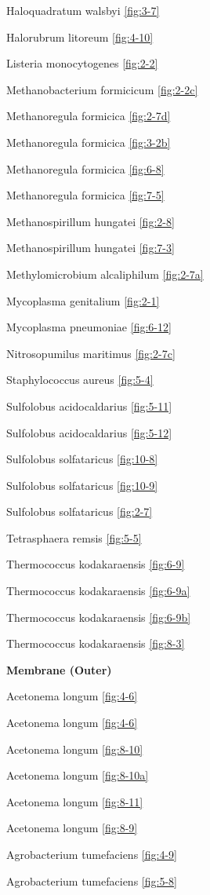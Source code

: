 \documentclass[]{tufte-book}
\begin{document}
Haloquadratum walsbyi \ref{fig:3-7}

Halorubrum litoreum \ref{fig:4-10}

Listeria monocytogenes \ref{fig:2-2}

Methanobacterium formicicum \ref{fig:2-2c}

Methanoregula formicica \ref{fig:2-7d}

Methanoregula formicica \ref{fig:3-2b}

Methanoregula formicica \ref{fig:6-8}

Methanoregula formicica \ref{fig:7-5}

Methanospirillum hungatei \ref{fig:2-8}

Methanospirillum hungatei \ref{fig:7-3}

Methylomicrobium alcaliphilum \ref{fig:2-7a}

Mycoplasma genitalium \ref{fig:2-1}

Mycoplasma pneumoniae \ref{fig:6-12}

Nitrosopumilus maritimus \ref{fig:2-7c}

Staphylococcus aureus \ref{fig:5-4}

Sulfolobus acidocaldarius \ref{fig:5-11}

Sulfolobus acidocaldarius \ref{fig:5-12}

Sulfolobus solfataricus \ref{fig:10-8}

Sulfolobus solfataricus \ref{fig:10-9}

Sulfolobus solfataricus \ref{fig:2-7}

Tetrasphaera remsis \ref{fig:5-5}

Thermococcus kodakaraensis \ref{fig:6-9}

Thermococcus kodakaraensis \ref{fig:6-9a}

Thermococcus kodakaraensis \ref{fig:6-9b}

Thermococcus kodakaraensis \ref{fig:8-3}

\textbf{Membrane (Outer)}

Acetonema longum \ref{fig:4-6}

Acetonema longum \ref{fig:4-6}

Acetonema longum \ref{fig:8-10}

Acetonema longum \ref{fig:8-10a}

Acetonema longum \ref{fig:8-11}

Acetonema longum \ref{fig:8-9}

Agrobacterium tumefaciens \ref{fig:4-9}

Agrobacterium tumefaciens \ref{fig:5-8}
\end{document}
